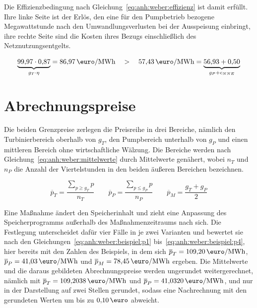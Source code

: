 Die Effizienzbedingung nach Gleichung~\eqref{eq:anh:weber:effizienz} ist damit erfüllt. Ihre linke Seite ist der Erlös, den eine für den Pumpbetrieb bezogene Megawattstunde nach den Umwandlungsverlusten bei der Ausspeisung einbringt, ihre rechte Seite sind die Kosten ihres Bezugs einschließlich des Netznutzungsentgelts.

\begin{equation}
  \underbrace{99{,}97 \cdot 0{,}87}_{g_T \cdot \eta} = 86{,}97\,\si{\text{\euro}\per MWh}
  \quad > \quad
  57{,}43\,\si{\text{\euro}\per MWh} = \underbrace{56{,}93 + 0{,}50}_{g_P + c_{NNE}}
  \label{eq:anh:weber:beispiel:effizienz}
\end{equation}

\section{Abrechnungspreise}
\label{anh:weber:abrechnung}

Die beiden Grenzpreise zerlegen die Preisreihe in drei Bereiche, nämlich den Turbinierbereich oberhalb von $g_T$, den Pumpbereich unterhalb von $g_P$ und einen mittleren Bereich ohne wirtschaftliche Wälzung. Die Bereiche werden nach Gleichung~\eqref{eq:anh:weber:mittelwerte} durch Mittelwerte genähert, wobei $n_T$ und $n_P$ die Anzahl der Viertelstunden in den beiden äußeren Bereichen bezeichnen.

\begin{equation}
  \overline{p}_T = \frac{\sum_{p \geq g_T} p}{n_T}
  \qquad
  \overline{p}_P = \frac{\sum_{p \leq g_P} p}{n_P}
  \qquad
  \overline{p}_M = \frac{g_T + g_P}{2}
  \label{eq:anh:weber:mittelwerte}
\end{equation}

Eine Maßnahme ändert den Speicherinhalt und zieht eine Anpassung des Speicherprogramms außerhalb des Maßnahmenzeitraums nach sich. Die Festlegung unterscheidet dafür vier Fälle in je zwei Varianten und bewertet sie nach den Gleichungen~\eqref{eq:anh:weber:beispiel:p1} bis~\eqref{eq:anh:weber:beispiel:p4}, hier bereits mit den Zahlen des Beispiels, in dem sich $\overline{p}_T = 109{,}20\,\si{\text{\euro}\per MWh}$, $\overline{p}_P = 41{,}03\,\si{\text{\euro}\per MWh}$ und $\overline{p}_M = 78{,}45\,\si{\text{\euro}\per MWh}$ ergeben. Die Mittelwerte und die daraus gebildeten Abrechnungspreise werden ungerundet weitergerechnet, nämlich mit $\overline{p}_T = 109{,}2038\,\si{\text{\euro}\per MWh}$ und $\overline{p}_P = 41{,}0320\,\si{\text{\euro}\per MWh}$, und nur in der Darstellung auf zwei Stellen gerundet, sodass eine Nachrechnung mit den gerundeten Werten um bis zu $0{,}10\,\text{\euro}$ abweicht.

